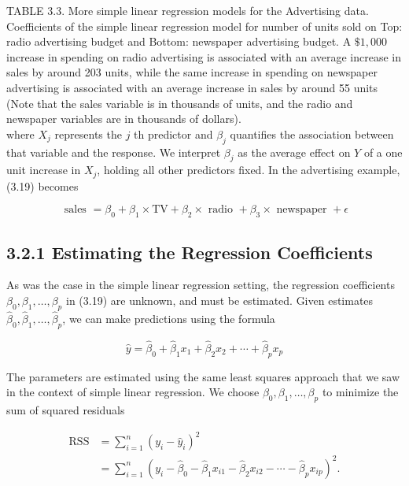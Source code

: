 \documentclass[10pt]{article}
\begin{document}
TABLE 3.3. More simple linear regression models for the Advertising data. Coefficients of the simple linear regression model for number of units sold on Top: radio advertising budget and Bottom: newspaper advertising budget. A $\$ 1,000$ increase in spending on radio advertising is associated with an average increase in sales by around 203 units, while the same increase in spending on newspaper advertising is associated with an average increase in sales by around 55 units (Note that the sales variable is in thousands of units, and the radio and newspaper variables are in thousands of dollars).\\
where $X_{j}$ represents the $j$ th predictor and $\beta_{j}$ quantifies the association between that variable and the response. We interpret $\beta_{j}$ as the average effect on $Y$ of a one unit increase in $X_{j}$, holding all other predictors fixed. In the advertising example, (3.19) becomes


\begin{equation*}
\text { sales }=\beta_{0}+\beta_{1} \times \mathrm{TV}+\beta_{2} \times \text { radio }+\beta_{3} \times \text { newspaper }+\epsilon \tag{3.20}
\end{equation*}


\subsection*{3.2.1 Estimating the Regression Coefficients}
As was the case in the simple linear regression setting, the regression coefficients $\beta_{0}, \beta_{1}, \ldots, \beta_{p}$ in (3.19) are unknown, and must be estimated. Given estimates $\hat{\beta}_{0}, \hat{\beta}_{1}, \ldots, \hat{\beta}_{p}$, we can make predictions using the formula


\begin{equation*}
\hat{y}=\hat{\beta}_{0}+\hat{\beta}_{1} x_{1}+\hat{\beta}_{2} x_{2}+\cdots+\hat{\beta}_{p} x_{p} \tag{3.21}
\end{equation*}


The parameters are estimated using the same least squares approach that we saw in the context of simple linear regression. We choose $\beta_{0}, \beta_{1}, \ldots, \beta_{p}$ to minimize the sum of squared residuals


\begin{align*}
\operatorname{RSS} & =\sum_{i=1}^{n}\left(y_{i}-\hat{y}_{i}\right)^{2} \\
& =\sum_{i=1}^{n}\left(y_{i}-\hat{\beta}_{0}-\hat{\beta}_{1} x_{i 1}-\hat{\beta}_{2} x_{i 2}-\cdots-\hat{\beta}_{p} x_{i p}\right)^{2} . \tag{3.22}
\end{align*}
\end{document}

